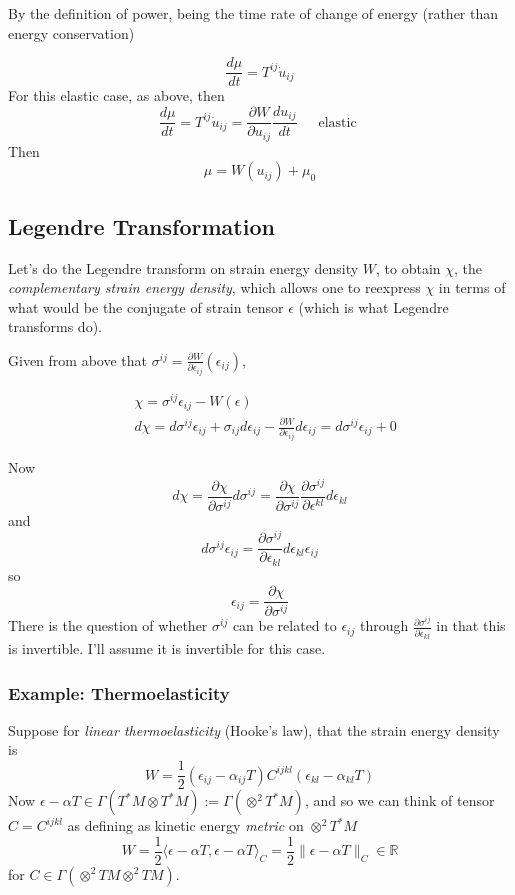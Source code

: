 \documentclass[twoside,landscape,10pt]{amsart}
\theoremstyle{plain}
\theoremstyle{definition}
\theoremstyle{remark}
\begin{document}
\begin{multicols*}{2}
By the definition of power, being the time rate of change of energy (rather than energy conservation)

\[
\frac{d\mu}{dt} = T^{ij} \dot{u}_{ij}
\]
For this elastic case, as above, then 
\[
\frac{d\mu}{dt} = T^{ij} \dot{u}_{ij} = \frac{ \partial W}{\partial u_{ij}} \frac{du_{ij}}{dt} \quad \, \text{ elastic }
\]
Then 
\[
\mu = W(u_{ij}) + \mu_0
\]

\subsection{Legendre Transformation}

Let's do the Legendre transform on strain energy density $W$, to obtain $\chi$, the \emph{complementary strain energy density}, which allows one to reexpress $\chi$ in terms of what would be the conjugate of strain tensor $\epsilon$ (which is what Legendre transforms do).  

Given from above that $\sigma^{ij} = \frac{ \partial W}{ \partial \epsilon_{ij}}(\epsilon_{ij})$, 

\[
\begin{aligned}
  & \chi = \sigma^{ij} \epsilon_{ij} - W(\epsilon) \\ 
  & d\chi = d\sigma^{ij} \epsilon_{ij} + \sigma_{ij} d\epsilon_{ij} - \frac{ \partial W}{\partial \epsilon_{ij} } d\epsilon_{ij} = d\sigma^{ij}\epsilon_{ij} + 0 
\end{aligned}
\]

Now
\[
d\chi = \frac{ \partial \chi}{ \partial \sigma^{ij}} d\sigma^{ij} = \frac{ \partial \chi}{ \partial \sigma^{ij}} \frac{ \partial \sigma^{ij}}{ \partial \epsilon^{kl} } d\epsilon_{kl}
\]
and 
\[
d\sigma^{ij}\epsilon_{ij} = \frac{ \partial \sigma^{ij}}{ \partial \epsilon_{kl}} d\epsilon_{kl} \epsilon_{ij}
\]
so
\[
\epsilon_{ij} = \frac{ \partial \chi }{ \partial \sigma^{ij}}
\]
There is the question of whether $\sigma^{ij}$ can be related to $\epsilon_{ij}$ through $\frac{ \partial \sigma^{ij} }{ \partial \epsilon_{kl}}$ in that this is invertible.  I'll assume it is invertible for this case.  

\subsubsection{Example: Thermoelasticity}

Suppose for \emph{linear thermoelasticity} (Hooke's law), that the strain energy density is 
\begin{equation}
  W = \frac{1}{2} (\epsilon_{ij} - \alpha_{ij}T) C^{ijkl}(\epsilon_{kl} - \alpha_{kl}T)
\end{equation}
Now $\epsilon -\alpha T \in \Gamma(T^*M \otimes T^*M) := \Gamma(\otimes^2T^*M)$, and so we can think of tensor $C = C^{ijkl}$ as defining as kinetic energy \emph{metric} on $\otimes^2T^*M$
\[
W = \frac{1}{2} \langle \epsilon-\alpha T, \epsilon-\alpha T\rangle_C = \frac{1}{2} \| \epsilon -\alpha T \|_C \in \mathbb{R}
\]
for $C\in \Gamma(\otimes^2TM \otimes^2TM)$.


\end{multicols*}
\end{document}
